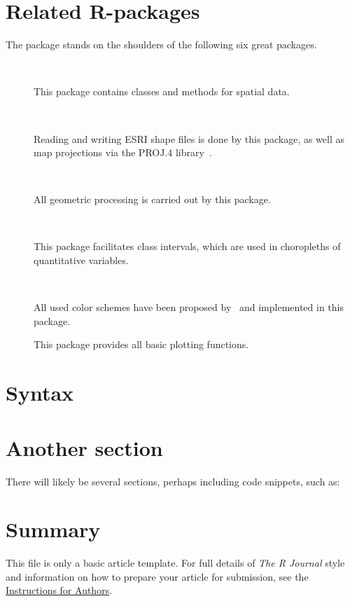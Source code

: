\section{Related R-packages}



The  package stands on the shoulders of the following six great packages.

\begin{description}
\item[~\citep{sp1, sp2}] This package contains classes and methods for spatial data. %
\item[~\citep{rgdal}] Reading and writing ESRI shape files is done by this package, as well as map projections via the PROJ.4 library~\citep{proj4}.
\item[~\citep{rgeos}] All geometric processing is carried out by this package.
\item[~\citep{classInt}] This package facilitates class intervals, which are used in choropleths of quantitative variables.
\item[~\citep{classInt}] All used color schemes have been proposed by~\citet{brewer03} and implemented in this package.
\item[] This package provides all basic plotting functions.
\end{description}







\section{Syntax}\label{syntax}


%

\section{Another section}

There will likely be several sections, perhaps including code snippets, such as:


\section{Summary}

This file is only a basic article template. For full details of \emph{The R Journal} style and information on how to prepare your article for submission, see the \href{http://journal.r-project.org/latex/RJauthorguide.pdf}{Instructions for Authors}.


\address{Martijn Tennekes\\
  Statistics Netherlands\\
  CBS-Weg 11, 6412 EX Heerlen\\
  Netherlands\\}


